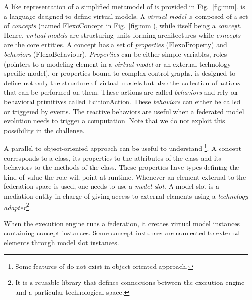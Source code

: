 A \UML like representation of a simplified metamodel of \FML is provided in
Fig.~\ref{fig:mm}. \FML is a language designed to define virtual models. A
\emph{virtual model} is composed of a set of \emph{concepts} (named
\textsf{FlexoConcept} in Fig.~\ref{fig:mm}), while itself being a
\emph{concept}. Hence, \emph{virtual models} are structuring units forming
architectures while \emph{concepts} are the core entities. A concept has a set
of \emph{properties} (\textsf{FlexoProperty}) and \emph{behaviors}
(\textsf{FlexoBehaviour}). \emph{Properties} can be either simple variables,
roles (pointers to a modeling element in a \emph{virtual model} or an external
technology-specific model), or properties bound to complex control graphs. \FML
is designed to define not only the structure of virtual models but also the
collection of actions that can be performed on them. These actions are called
\emph{behaviors} and rely on behavioral primitives called
\textsf{EditionAction}. These \emph{behaviors} can either be called or
triggered by events. The reactive behaviors are useful when a federated model
evolution needs to trigger a computation. Note that we do not exploit this
possibility in the challenge.

A parallel to object-oriented approach can be useful to understand
\FML\footnote{Some features of \FML do not exist in object oriented approach.}.
A concept corresponds to a class, its properties to the attributes of the class
and its behaviors to the methods of the class. These properties have types
defining the kind of value the role will point at runtime. Whenever an element
external to the federation space is used, one needs to use a \emph{model slot}.
A model slot is a mediation entity in charge of giving access to external
elements using a \emph{technology adapter}\footnote{It is a reusable library
that defines connections between the \FML execution engine and a particular
technological space.}.

When the \FML execution engine runs a federation, it creates virtual
model instances containing concept instances. Some concept instances
are connected to external elements through model slot instances.



